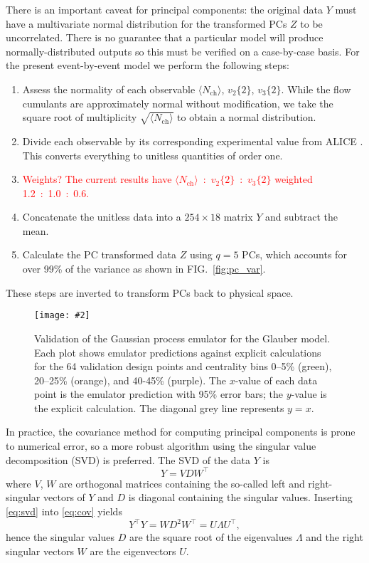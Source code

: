 \documentclass[aps,prc,reprint,superscriptaddress,amsmath]{revtex4-1}
\newcommand{\todo}[1]{\textcolor{red}{#1}}
\newcommand{\widefig}[3][t]{
  \begin{figure*}[#1]
    \texttt{[image: \#2]}
    \caption{\label{fig:#2}#3}
  \end{figure*}
}
\newcommand{\avg}[1]{\langle #1 \rangle}
\newcommand{\nch}{N_\text{ch}}
\newcommand{\vnk}[2]{v_#1\{#2\}}
\newcommand{\tran}{^\intercal}
\begin{document}
There is an important caveat for principal components:
the original data $Y$ must have a multivariate normal distribution for the transformed PCs $Z$ to be uncorrelated.
There is no guarantee that a particular model will produce normally-distributed outputs so this must be verified on a case-by-case basis.
For the present event-by-event model we perform the following steps:
\begin{enumerate}
  \item Assess the normality of each observable $\avg\nch$, $\vnk 2 2$, $\vnk 3 2$.
    While the flow cumulants are approximately normal without modification, we take the square root of multiplicity $\sqrt{\avg\nch}$ to obtain a normal distribution.
  \item Divide each observable by its corresponding experimental value from ALICE \cite{Abelev:2014mda}.
    This converts everything to unitless quantities of order one.
  \item \todo{Weights?  The current results have $\avg\nch$~:~$\vnk 2 2$~:~$\vnk 3 2$ weighted 1.2~:~1.0~:~0.6.}
  \item Concatenate the unitless data into a $254 \times 18$ matrix $Y$ and subtract the mean.
  \item Calculate the PC transformed data $Z$ using $q = 5$ PCs, which accounts for over 99\% of the variance as shown in FIG.~\ref{fig:pc_var}.
\end{enumerate}
These steps are inverted to transform PCs back to physical space.

\widefig{validation}{
  Validation of the Gaussian process emulator for the Glauber model.
  Each plot shows emulator predictions against explicit calculations for the 64 validation design points and centrality bins 0--5\% (green), 20--25\% (orange), and 40-45\% (purple).
  The $x$-value of each data point is the emulator prediction with 95\% error bars; the $y$-value is the explicit calculation.
  The diagonal grey line represents $y = x$.
}

In practice, the covariance method for computing principal components is prone to numerical error, so a more robust algorithm using the singular value decomposition (SVD) is preferred.
The SVD of the data $Y$ is
\begin{equation}
  Y = VDW\tran
  \label{eq:svd}
\end{equation}
where $V$, $W$ are orthogonal matrices containing the so-called left and right-singular vectors of $Y$ and $D$ is diagonal containing the singular values.
Inserting \eqref{eq:svd} into \eqref{eq:cov} yields
\begin{equation}
  Y\tran Y = W D^2 W\tran = U \Lambda U\tran,
\end{equation}
hence the singular values $D$ are the square root of the eigenvalues $\Lambda$ and the right singular vectors $W$ are the eigenvectors $U$.
\end{document}
